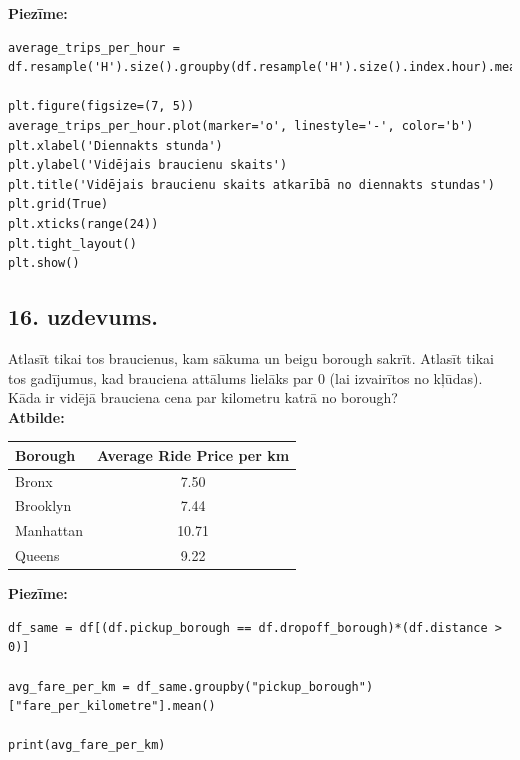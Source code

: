\documentclass[12pt]{article}
\begin{document}
\noindent \textbf{Piezīme:}
\begin{verbatim}
average_trips_per_hour = df.resample('H').size().groupby(df.resample('H').size().index.hour).mean()

plt.figure(figsize=(7, 5))
average_trips_per_hour.plot(marker='o', linestyle='-', color='b')
plt.xlabel('Diennakts stunda')
plt.ylabel('Vidējais braucienu skaits')
plt.title('Vidējais braucienu skaits atkarībā no diennakts stundas')
plt.grid(True)
plt.xticks(range(24))
plt.tight_layout()
plt.show()
\end{verbatim}
\subsection*{16. uzdevums.} Atlasīt tikai tos braucienus, kam sākuma un beigu borough sakrīt. Atlasīt tikai tos gadījumus, kad brauciena attālums lielāks par 0 (lai izvairītos no kļūdas). Kāda ir vidējā brauciena cena par kilometru katrā no borough? \\
\textbf{Atbilde:} \begin{table}[ht]
\centering
\begin{tabular}{lc}
\hline
Borough    & Average Ride Price per km \\ \hline
Bronx      & 7.50                      \\
Brooklyn   & 7.44                      \\
Manhattan  & 10.71                     \\
Queens     & 9.22                      \\ \hline
\end{tabular}
\label{tab:ride_price}
\end{table}

\noindent \textbf{Piezīme:}
\begin{verbatim}
df_same = df[(df.pickup_borough == df.dropoff_borough)*(df.distance > 0)]

avg_fare_per_km = df_same.groupby("pickup_borough")["fare_per_kilometre"].mean()

print(avg_fare_per_km)
\end{verbatim}
\end{document}
